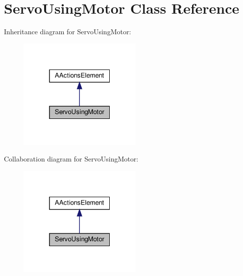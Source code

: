 \hypertarget{classServoUsingMotor}{}\section{Servo\+Using\+Motor Class Reference}
\label{classServoUsingMotor}


Inheritance diagram for Servo\+Using\+Motor\+:
\nopagebreak
\begin{figure}[H]
\begin{center}
\leavevmode
\includegraphics[width=172pt]{classServoUsingMotor__inherit__graph}
\end{center}
\end{figure}


Collaboration diagram for Servo\+Using\+Motor\+:
\nopagebreak
\begin{figure}[H]
\begin{center}
\leavevmode
\includegraphics[width=172pt]{classServoUsingMotor__coll__graph}
\end{center}
\end{figure}
